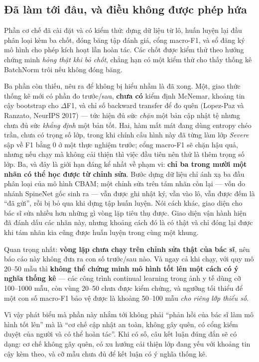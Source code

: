 \documentclass[11pt,a4paper]{article}
\begin{document}
\subsection{Đã làm tới đâu, và điều không được phép hứa}

Phần cơ chế đã cài đặt và có kiểm thử: dựng dữ liệu từ lô, huấn luyện lại đầu phân loại kèm ba chốt,
đóng băng tập đánh giá, cổng macro-F1, và sổ đăng ký mô hình cho phép kích hoạt lẫn hoàn tác. Các
chốt được kiểm thử theo hướng chứng minh \textit{hỏng thật khi bỏ chốt}, chẳng hạn có một kiểm thử
cho thấy thống kê BatchNorm trôi nếu không đóng băng.

Ba phần còn thiếu, nêu ra để không bị hiểu nhầm là đã xong. Một, giao thức thống kê mới có phần đo
trước/sau, \textbf{chưa có} kiểm định McNemar, khoảng tin cậy bootstrap cho $\Delta$F1, và chỉ số
backward transfer để đo quên (Lopez-Paz và Ranzato, NeurIPS 2017) --- tức hiện đủ sức \textit{chặn}
một bản cập nhật tệ nhưng chưa đủ sức \textit{khẳng định} một bản tốt. Hai, hàm mất mát đang dùng
entropy chéo trần, chưa có trọng số lớp, trong khi chính cấu hình này đã từng làm lớp \textit{Severe}
sập về F1 bằng 0 ở một thực nghiệm trước; cổng macro-F1 sẽ chặn hậu quả, nhưng nếu chạy mà không
cải thiện thì việc đầu tiên nên thử là thêm trọng số lớp. Ba, và đây là giới hạn đáng kể nhất về
phạm vi: \textbf{chỉ ba trong mười một nhãn có thể học được từ chỉnh sửa}. Bước dựng dữ liệu chỉ
ánh xạ ba đầu phân loại của mô hình CBAM; một chỉnh sửa trên tám nhãn còn lại --- vốn do nhánh
SpineNet gốc sinh ra --- vẫn được ghi nhật ký, vẫn vào lô, vẫn được đếm là ``đã gửi'', rồi bị bỏ
qua khi dựng tập huấn luyện. Nói cách khác, giao diện cho bác sĩ sửa nhiều hơn những gì vòng lặp
tiêu thụ được. Giao diện vận hành hiện đã đánh dấu các nhãn này, nhưng khoảng cách đó là có thật
và chỉ đóng lại được khi tám nhãn kia cũng được huấn luyện trong cùng một khung.

Quan trọng nhất: \textbf{vòng lặp chưa chạy trên chỉnh sửa thật của bác sĩ}, nên báo cáo này không
đưa ra con số trước/sau nào. Và ngay cả khi chạy, với quy mô 20--50 mẫu thì \textbf{không thể chứng
minh mô hình tốt lên một cách có ý nghĩa thống kê} --- các công trình continual learning trong ảnh
y tế dùng cỡ 100--1000 mẫu, còn vùng 20--50 chưa được kiểm chứng, và ngưỡng tối thiểu để một con số
macro-F1 bảo vệ được là khoảng 50--100 mẫu \textit{cho riêng lớp thiểu số}.

Vì vậy phát biểu mà phần này nhắm tới không phải ``phản hồi của bác sĩ làm mô hình tốt lên'' mà là
``cơ chế cập nhật an toàn, không gây quên, có cổng kiểm duyệt của người và có thể hoàn tác''. Khi
có số, câu kết luận đúng đắn sẽ có dạng: cơ chế không gây quên, có xu hướng cải thiện lớp đang yếu
với khoảng tin cậy kèm theo, và cỡ mẫu chưa đủ để kết luận có ý nghĩa thống kê.
\end{document}
